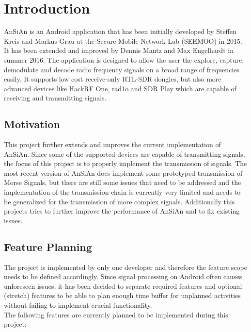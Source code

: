 \chapter{Introduction}
	\ac{AnSiAn} is an Android application that has been initially developed by Steffen Kreis and Markus Grau at the Secure Mobile Network Lab (SEEMOO) in 2015. It has been extended and improved by Dennis Mantz and Max Engelhardt in summer 2016. The application is designed to allow the user the explore, capture, demodulate and decode radio frequency signals on a broad range of frequencies easily. It supports low cost receive-only RTL-SDR dongles, but also more advanced devices like HackRF One, rad1o and SDR Play which are capable of receiving and transmitting signals.
	
	
\section{Motivation}
	This project further extends and improves the current implementation of \ac{AnSiAn}. Since some of the supported devices are capable of transmitting signals, the focus of this project is to properly implement the transmission of signals. The most recent version of \ac{AnSiAn} does implement some prototyped transmission of Morse Signals, but there are still some issues that need to be addressed and the implementation of the transmission chain is currently very limited and needs to be generalized for the transmission of more complex signals. Additionally this projects tries to further improve the performance of \ac{AnSiAn} and to fix existing issues. 

\section{Feature Planning}
	The project is implemented by only one developer and therefore the feature scope needs to be defined accordingly. Since signal processing on Android often causes unforeseen issues, it has been decided to separate required features and optional (stretch) features to be able to plan enough time buffer for unplanned activities without failing to implement crucial functionality. \\
	
	The following features are currently planned to be implemented during this project:
	

